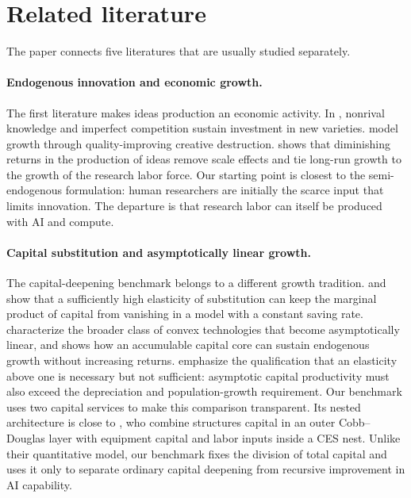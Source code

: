 \section{Related literature}
\label{sec:literature}

The paper connects five literatures that are usually studied separately.

\paragraph{Endogenous innovation and economic growth.}
The first literature makes ideas production an economic activity. In
\citet{romer1990}, nonrival knowledge and imperfect competition sustain investment in
new varieties. \citet{aghionhowitt1992} model growth through quality-improving creative
destruction. \citet{jones1995} shows that diminishing returns in the production of ideas
remove scale effects and tie long-run growth to the growth of the research labor force.
Our starting point is closest to the semi-endogenous formulation: human researchers
are initially the scarce input that limits innovation. The departure is that research
labor can itself be produced with AI and compute.

\paragraph{Capital substitution and asymptotically linear growth.}
The capital-deepening benchmark belongs to a different growth tradition.
\citet{solow1956} and \citet{pitchford1960} show that a sufficiently high elasticity
of substitution can keep the marginal product of capital from vanishing in a model
with a constant saving rate. \citet{jonesmanuelli1990} characterize the broader class
of convex technologies that become asymptotically linear, and \citet{rebelo1991}
shows how an accumulable capital core can sustain endogenous growth without
increasing returns. \citet{duffypapageorgiou2000} emphasize the qualification that an
elasticity above one is necessary but not sufficient: asymptotic capital productivity
must also exceed the depreciation and population-growth requirement. Our benchmark
uses two capital services to make this comparison transparent. Its nested architecture
is close to \citet{kruselletral2000}, who combine structures capital in an outer
Cobb--Douglas layer with equipment capital and labor inputs inside a CES nest. Unlike
their quantitative model, our benchmark fixes the division of total capital and uses
it only to separate ordinary capital deepening from recursive improvement in AI
capability.

